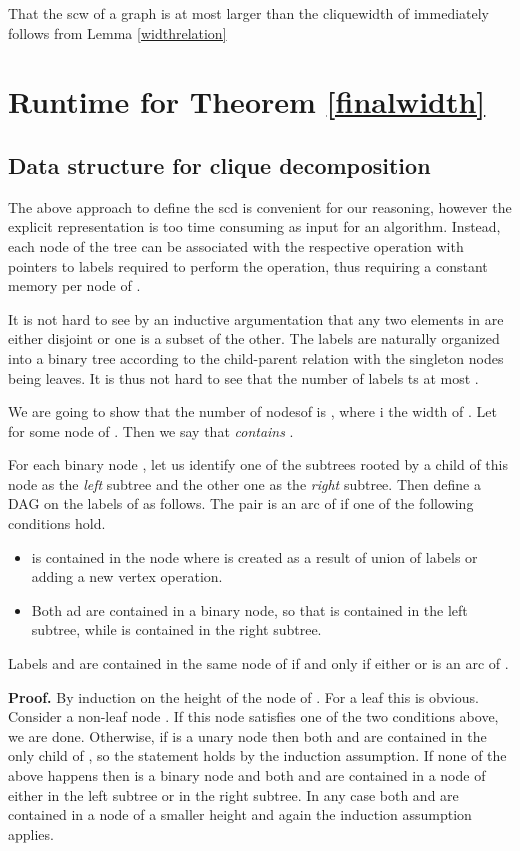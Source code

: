 \documentclass{llncs}
\begin{document}
That the {\sc scw} of a graph  is at most larger than the cliquewidth of  immediately
follows from Lemma \ref{widthrelation} 
\section{Runtime for Theorem \ref{finalwidth}}
\subsection{Data structure for clique decomposition}
The above approach to define the {\sc scd} is convenient for our reasoning, however the explicit
representation  is too time consuming as input for an algorithm. Instead, each node
of the tree can be associated with the respective operation with pointers to labels required to
perform the operation, thus requiring a constant memory per node of . 


It is not hard to see by an inductive argumentation that any two elements in  are either disjoint or one 
is a subset of the other. The labels are naturally organized into a binary tree according to the child-parent relation
with the singleton nodes being leaves. It is thus not hard to see that the number of labels ts at most .

We are going to show that the number of nodesof  is , where  i the width of .
Let  for some node  of . Then we say that  \emph{contains}
.

For each binary node , let us identify one of the subtrees rooted by a child of this node 
as the \emph{left} subtree and the other one as the \emph{right} subtree. Then define a DAG  on the
labels of  as follows. The pair  is an arc of  if one of
the following conditions hold.

\begin{itemize}
\item  is contained in the node where  is created as a result of union of
labels or adding a new vertex operation.
\item Both  ad  are contained in a binary node, so that  is contained in
the left subtree, while  is contained in the right subtree.
\end{itemize}

\begin{lemma} \label{dsize}
Labels  and  are contained in the same node of  if and only if either
 or  is an arc of . 
\end{lemma}

{\bf Proof.}
By induction on the height of the node of .
For a leaf this is obvious. Consider a non-leaf node . If this node satisfies
one of the two conditions above, we are done. Otherwise, if  is a unary node
then both  and  are contained in the only child of , so the statement
holds by the induction assumption. If none of the above happens then 
is a binary node and both  and  are contained in a node of either in the left subtree
or in the right subtree. In any case both  and  are contained in a node of a smaller
height and again the induction assumption applies. 
\end{document}
